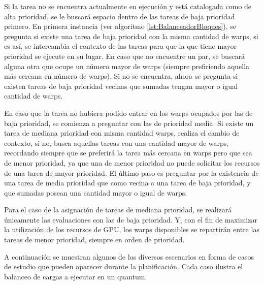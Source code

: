 

Si la tarea no se encuentra actualmente en ejecución y está catalogada como de alta prioridad, se le buscará espacio dentro de las tareas de baja prioridad primero. En primera instancia (ver algoritmo \ref{lst:BalanceadorBloques}), se pregunta si existe una tarea de baja prioridad con la misma cantidad de warps, si es así, se intercambia el contexto de las tareas para que la que tiene mayor prioridad se ejecute en su lugar. 
En caso que no encuentre un par, se buscará alguna otra que ocupe un número mayor de warps (siempre prefiriendo aquella más cercana en número de warps). Si no se encuentra, ahora se pregunta si existen tareas de baja prioridad vecinas que sumadas tengan mayor o igual cantidad de warps. 

En caso que la tarea no hubiera podido entrar en los warps ocupados por las de baja prioridad, se comienza a preguntar con las de prioridad media. Si existe un tarea de mediana prioridad con misma cantidad warps, realiza el cambio de contexto, si no, busca aquellas tareas con una cantidad mayor de warps, recordando siempre que se preferirá la tarea más cercana en warps pero que sea de menor prioridad, ya que una de menor prioridad no puede solicitar los recursos de una tarea de mayor prioridad. 
El último paso es preguntar por la existencia de una tarea de media prioridad que como vecina a una tarea de baja prioridad, y que sumadas posean una cantidad mayor o igual de warps.
\newline

Para el caso de la asignación de tareas de mediana prioridad, se realizará únicamente las evaluaciones con las de baja prioridad. Y, con el fin de maximizar la utilización de los recursos de GPU, los warps disponibles se repartirán entre las tareas de menor prioridad, siempre en orden de prioridad.
\newline

A continuación se muestran algunos de los diversos escenarios en forma de casos de estudio que pueden aparecer durante la planificación. Cada caso ilustra el balanceo de cargas a ejecutar en un quantum. 
\newline

